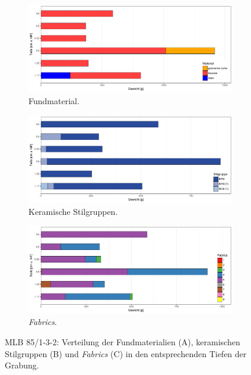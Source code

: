 \begin{figure}[p]
	\centering
	\begin{subfigure}[t]{\textwidth}
		\centering
		\includegraphics[width=\textwidth]{fig/9-2_MLB85-132_VerteilungFunde_R.pdf}
		\caption{Fundmaterial.\vspace{1em}}
		\label{fig:MLB85-132_VerteilungFunde}
	\end{subfigure}
	\begin{subfigure}[t]{\textwidth}
		\centering
		\includegraphics[width=\textwidth]{fig/9-2_MLB85-132_KeramikStilgruppen_R.pdf}
		\caption{Keramische Stilgruppen.\vspace{1em}}
		\label{fig:MLB85-132_KeramikStilgruppen}
	\end{subfigure}
	\begin{subfigure}[t]{\textwidth}
		\centering
		\includegraphics[width=\textwidth]{fig/9-2_MLB85-132_Fabrics_R.pdf}
		\caption{\textit{Fabrics}.}
		\label{fig:MLB85-132_VerteilungFabrics}
	\end{subfigure}
	\caption{MLB 85/1-3-2: Verteilung der Fundmaterialien (A), keramischen Stilgruppen (B) und \textit{Fabrics} (C) in den entsprechenden Tiefen der Grabung.}
	\label{fig:MLB85-132_Verteilung}
\end{figure}

